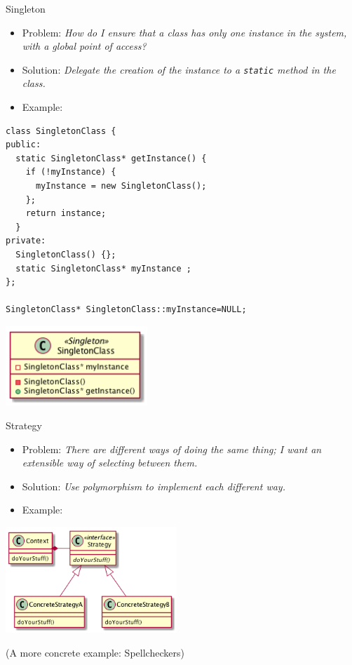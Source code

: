 \documentclass[10pt,t,a4paper]{beamer}
\begin{document}
\begin{frame}[fragile,shrink=15,label={sec:orgheadline13}]{Singleton}
 \begin{itemize}
\item Problem: \emph{How do I ensure that a class has only one instance in the system, with a global point of access?}
\item Solution: \emph{Delegate the creation of the instance to a \texttt{static} method in the class.}
\item Example:
\end{itemize}
\begin{verbatim}
class SingletonClass {
public:
  static SingletonClass* getInstance() {
    if (!myInstance) {
      myInstance = new SingletonClass();
    };
    return instance;
  }
private:
  SingletonClass() {};
  static SingletonClass* myInstance ;
};

SingletonClass* SingletonClass::myInstance=NULL;
\end{verbatim}

\includegraphics[height=3cm]{FSingleton.png}
\end{frame}
\begin{frame}[label={sec:orgheadline14}]{Strategy}
\begin{itemize}
\item Problem: \emph{There are different ways of doing the same thing; I want an extensible way of selecting between them.}
\item Solution: \emph{Use polymorphism to implement each different way.}
\item Example:
\end{itemize}

\includegraphics[height=4cm]{FStrategy.png}

(A more concrete example: Spellcheckers)
\end{frame}
\end{document}
